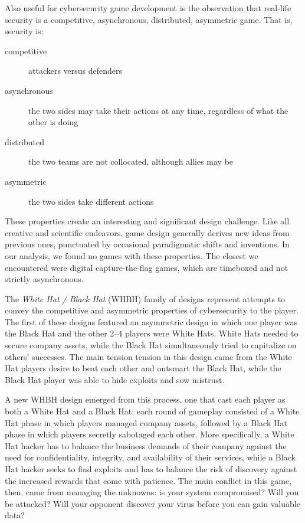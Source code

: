 \documentclass[letterpaper]{article}
\begin{document}
Also useful for cybersecurity game development is the observation
that real-life security is a competitive, asynchronous, distributed,
asymmetric game. That is, security is:
\begin{description}
\item[competitive] attackers versus defenders
\item[asynchronous]  the two sides may take their actions at any time,
 regardless of what the other is doing
\item[distributed] the two teams are not collocated, although
 allies may be
\item[asymmetric] the two sides take different actions
\end{description}
These properties create an interesting and significant design challenge.
Like all creative and scientific endeavors,  game design generally
derives new ideas from previous ones, punctuated by occasional
paradigmatic shifts and inventions. In our analysis, we found
no games with these properties. The closest we encountered were
digital capture-the-flag games, which are timeboxed and not strictly
asynchronous.

The \textit{White Hat / Black Hat} (WHBH) family of designs
represent attempts to convey the competitive and asymmetric properties
of cybersecurity to the player.
The first of these designs featured an asymmetric design in which
one player was the Black Hat and the other 2--4 players were 
White Hats. White Hats needed to secure company assets, while the
Black Hat simultaneously tried to capitalize on others' successes.
The main tension 
tension in this design came from the White Hat players desire
to beat each other and outsmart the Black Hat, while the Black Hat
player was able to hide exploits and sow mistrust.

A new WHBH design emerged from this process, one that cast each player
as both a White Hat and a Black Hat: each round of gameplay consisted
of a White Hat phase in which players managed company assets, followed
by a Black Hat phase in which players secretly sabotaged each other.
More specifically, a White Hat hacker has to balance the business
demands of their company against the need for confidentiality,
integrity, and availability of their services, while a Black Hat
hacker seeks to find exploits and has to balance the risk of discovery
against the increased rewards that come with patience.  The main
conflict in this game, then, came from managing the unknowns: is your
system compromised? Will you be attacked? Will your opponent discover
your virus before you can gain valuable data?
\end{document}

